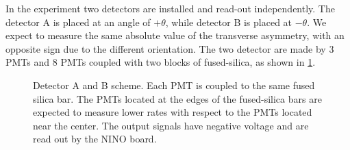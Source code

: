 In the experiment two detectors are installed and read-out independently. The detector A is placed at an angle of $+\theta$, while detector B is placed at $-\theta$. We expect to measure the same absolute value of the transverse asymmetry, with an opposite sign due to the different orientation. 
The two detector are made by 3 PMTs and 8 PMTs coupled with two blocks of fused-silica, as shown in \ref{fig:DetectorAB}.

\begin{figure}[hbtp]
\centering
{}
\caption{Detector A and B scheme. Each PMT is coupled to the same fused silica bar. The PMTs located at the edges of the fused-silica bars are expected to measure lower rates with respect to the PMTs located near the center. The output signals have negative voltage and are read out by the NINO board.}
\label{fig:DetectorAB}
\end{figure}

